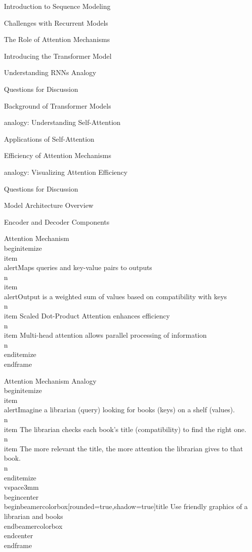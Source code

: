 \documentclass{beamer}
\begin{document}
\begin{frame}[]{Introduction to Sequence Modeling}
\begin{frame}[]{Challenges with Recurrent Models}
\begin{frame}[]{The Role of Attention Mechanisms}
\begin{frame}[]{Introducing the Transformer Model}
\begin{frame}[plain]{Understanding RNNs Analogy}
\begin{frame}[]{Questions for Discussion}
\begin{frame}[]{Background of Transformer Models}
\begin{frame}[plain]{analogy: Understanding Self-Attention}
\begin{frame}[]{Applications of Self-Attention}
\begin{frame}[]{Efficiency of Attention Mechanisms}
\begin{frame}[plain]{analogy: Visualizing Attention Efficiency}
\begin{frame}[]{Questions for Discussion}
\begin{frame}[]{Model Architecture Overview}
\begin{frame}[]{Encoder and Decoder Components}
\begingroup
{}\n{}\n\begin{frame}[]{Attention Mechanism}\n\\begin{itemize}
\\item \\alert{Maps queries and key-value pairs to outputs}\\n\\item \\alert{Output is a weighted sum of values based on compatibility with keys}\\n\\item Scaled Dot-Product Attention enhances efficiency\\n\\item Multi-head attention allows parallel processing of information\\n\\end{itemize}
\\end{frame}

\endgroup

\begingroup
{}\n{}\n\begin{frame}[plain]{Attention Mechanism Analogy}\n\\begin{itemize}
\\item \\alert{Imagine a librarian (query) looking for books (keys) on a shelf (values).}\\n\\item The librarian checks each book's title (compatibility) to find the right one.\\n\\item The more relevant the title, the more attention the librarian gives to that book.\\n\\end{itemize}
\\vspace{3mm}
\\begin{center}
\\begin{beamercolorbox}[rounded=true,shadow=true]{title}
Use friendly graphics of a librarian and books
\\end{beamercolorbox}
\\end{center}
\\end{frame}

\endgroup


\end{frame}
\end{frame}
\end{frame}
\end{frame}
\end{frame}
\end{frame}
\end{frame}
\end{frame}
\end{frame}
\end{frame}
\end{frame}
\end{frame}
\end{frame}
\end{frame}
\end{frame}
\end{frame}
\end{document}
